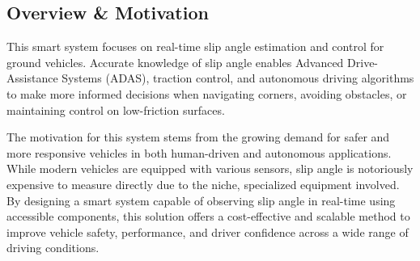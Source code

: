 \documentclass[12pt]{article}
\begin{document}
        \subsection{Overview \& Motivation}
        
        This smart system focuses on real-time slip angle estimation and control for ground vehicles. Accurate knowledge of 
        slip angle enables Advanced Drive-Assistance Systems (ADAS), traction control, and autonomous driving algorithms to make 
        more informed decisions when navigating corners, avoiding obstacles, or maintaining control on low-friction surfaces. 
        
        The motivation for this system stems from the growing demand for safer and more responsive vehicles in both human-driven 
        and autonomous applications. While modern vehicles are equipped with various sensors, slip angle is notoriously expensive 
        to measure directly due to the niche, specialized equipment involved. By designing a smart system capable of observing slip 
        angle in real-time using accessible components, this solution offers a cost-effective and scalable method to improve vehicle 
        safety, performance, and driver confidence across a wide range of driving conditions. 



    \newpage
    \printbibliography[title=Works Cited]

\end{document}
